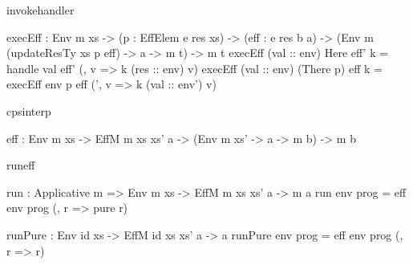 \begin{SaveVerbatim}{invokehandler}

execEff : Env m xs -> (p : EffElem e res xs) -> 
          (eff : e res b a) ->
          (Env m (updateResTy xs p eff) -> a -> m t) -> 
          m t
execEff (val :: env) Here eff' k 
    = handle val eff' (\res, v => k (res :: env) v)
execEff (val :: env) (There p) eff k 
    = execEff env p eff (\env', v => k (val :: env') v)

\end{SaveVerbatim}

\begin{SaveVerbatim}{cpsinterp}

eff : Env m xs -> EffM m xs xs' a -> 
      (Env m xs' -> a -> m b) -> m b

\end{SaveVerbatim}

\begin{SaveVerbatim}{runeff}

run : Applicative m => 
      Env m xs -> EffM m xs xs' a -> m a
run env prog = eff env prog (\env, r => pure r)

runPure : Env id xs -> EffM id xs xs' a -> a
runPure env prog = eff env prog (\env, r => r)

\end{SaveVerbatim}

